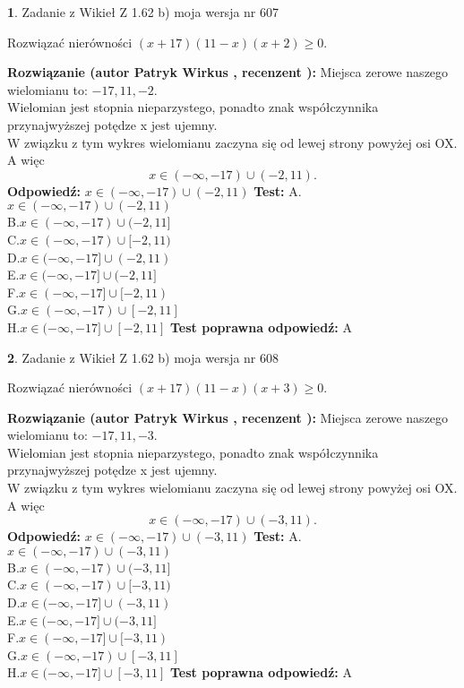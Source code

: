 \documentclass[12pt, a4paper]{article}
\theoremstyle{definition} %
\newtheorem{zad}{}
\newcommand{\zadStart}[1]{\begin{zad}#1\newline}
\newcommand{\zadStop}{\end{zad}}
\newcommand{\rozwStart}[2]{\noindent \textbf{Rozwiązanie (autor #1 , recenzent #2): }\newline}
\newcommand{\rozwStop}{\newline}
\newcommand{\odpStart}{\noindent \textbf{Odpowiedź:}\newline}
\newcommand{\odpStop}{\newline}
\newcommand{\testStart}{\noindent \textbf{Test:}\newline}
\newcommand{\testStop}{\newline}
\newcommand{\kluczStart}{\noindent \textbf{Test poprawna odpowiedź:}\newline}
\newcommand{\kluczStop}{\newline}
\begin{document}
\zadStart{Zadanie z Wikieł Z 1.62 b) moja wersja nr 607}

Rozwiązać nierówności $(x+17)(11-x)(x+2)\ge0$.
\zadStop
\rozwStart{Patryk Wirkus}{}
Miejsca zerowe naszego wielomianu to: $-17, 11, -2$.\\
Wielomian jest stopnia nieparzystego, ponadto znak współczynnika przy\linebreak najwyższej potędze x jest ujemny.\\ W związku z tym wykres wielomianu zaczyna się od lewej strony powyżej osi OX. A więc $$x \in (-\infty,-17) \cup (-2,11).$$
\rozwStop
\odpStart
$x \in (-\infty,-17) \cup (-2,11)$
\odpStop
\testStart
A.$x \in (-\infty,-17) \cup (-2,11)$\\
B.$x \in (-\infty,-17) \cup (-2,11]$\\
C.$x \in (-\infty,-17) \cup [-2,11)$\\
D.$x \in (-\infty,-17] \cup (-2,11)$\\
E.$x \in (-\infty,-17] \cup (-2,11]$\\
F.$x \in (-\infty,-17] \cup [-2,11)$\\
G.$x \in (-\infty,-17) \cup [-2,11]$\\
H.$x \in (-\infty,-17] \cup [-2,11]$
\testStop
\kluczStart
A
\kluczStop



\zadStart{Zadanie z Wikieł Z 1.62 b) moja wersja nr 608}

Rozwiązać nierówności $(x+17)(11-x)(x+3)\ge0$.
\zadStop
\rozwStart{Patryk Wirkus}{}
Miejsca zerowe naszego wielomianu to: $-17, 11, -3$.\\
Wielomian jest stopnia nieparzystego, ponadto znak współczynnika przy\linebreak najwyższej potędze x jest ujemny.\\ W związku z tym wykres wielomianu zaczyna się od lewej strony powyżej osi OX. A więc $$x \in (-\infty,-17) \cup (-3,11).$$
\rozwStop
\odpStart
$x \in (-\infty,-17) \cup (-3,11)$
\odpStop
\testStart
A.$x \in (-\infty,-17) \cup (-3,11)$\\
B.$x \in (-\infty,-17) \cup (-3,11]$\\
C.$x \in (-\infty,-17) \cup [-3,11)$\\
D.$x \in (-\infty,-17] \cup (-3,11)$\\
E.$x \in (-\infty,-17] \cup (-3,11]$\\
F.$x \in (-\infty,-17] \cup [-3,11)$\\
G.$x \in (-\infty,-17) \cup [-3,11]$\\
H.$x \in (-\infty,-17] \cup [-3,11]$
\testStop
\kluczStart
A
\kluczStop
\end{document}
